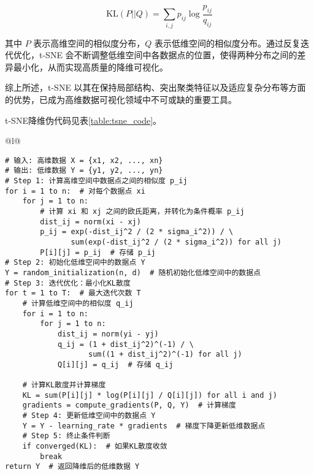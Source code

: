 \documentclass[master]{thesis-uestc}
\begin{document}
\begin{equation}
\text{KL}(P || Q) = \sum_{i,j} p_{ij} \log \frac{p_{ij}}{q_{ij}}
\end{equation}

其中 \(P\) 表示高维空间的相似度分布，\(Q\) 表示低维空间的相似度分布。通过反复迭代优化，t-SNE 会不断调整低维空间中各数据点的位置，使得两种分布之间的差异最小化，从而实现高质量的降维可视化。

综上所述，t-SNE 以其在保持局部结构、突出聚类特征以及适应复杂分布等方面的优势，已成为高维数据可视化领域中不可或缺的重要工具。

t-SNE降维伪代码见表\ref{table:tsne_code}。
\begin{table}[h]
    \caption{{t-SNE算法伪代码}}
    { %
    \begin{tabular}{@{}l@{}} %
    \toprule
     \\
    \midrule
    \begin{lstlisting}[basicstyle=\fontspec{Times New Roman}, frame=none]
# 输入: 高维数据 X = {x1, x2, ..., xn}
# 输出: 低维数据 Y = {y1, y2, ..., yn}
# Step 1: 计算高维空间中数据点之间的相似度 p_ij
for i = 1 to n:  # 对每个数据点 xi
    for j = 1 to n:
        # 计算 xi 和 xj 之间的欧氏距离，并转化为条件概率 p_ij
        dist_ij = norm(xi - xj)
        p_ij = exp(-dist_ij^2 / (2 * sigma_i^2)) / \
               sum(exp(-dist_ij^2 / (2 * sigma_i^2)) for all j)
        P[i][j] = p_ij  # 存储 p_ij    
# Step 2: 初始化低维空间中的数据点 Y
Y = random_initialization(n, d)  # 随机初始化低维空间中的数据点
# Step 3: 迭代优化：最小化KL散度
for t = 1 to T:  # 最大迭代次数 T
    # 计算低维空间中的相似度 q_ij
    for i = 1 to n:
        for j = 1 to n:
            dist_ij = norm(yi - yj)
            q_ij = (1 + dist_ij^2)^(-1) / \
                   sum((1 + dist_ij^2)^(-1) for all j)
            Q[i][j] = q_ij  # 存储 q_ij

    # 计算KL散度并计算梯度
    KL = sum(P[i][j] * log(P[i][j] / Q[i][j]) for all i and j)
    gradients = compute_gradients(P, Q, Y)  # 计算梯度    
    # Step 4: 更新低维空间中的数据点 Y
    Y = Y - learning_rate * gradients  # 梯度下降更新低维数据点
    # Step 5: 终止条件判断
    if converged(KL):  # 如果KL散度收敛
        break
return Y  # 返回降维后的低维数据 Y
    \end{lstlisting} \\
    \bottomrule
    \end{tabular}
    }
    \label{table:tsne_code}
\end{table}
\FloatBarrier  %
\end{document}
